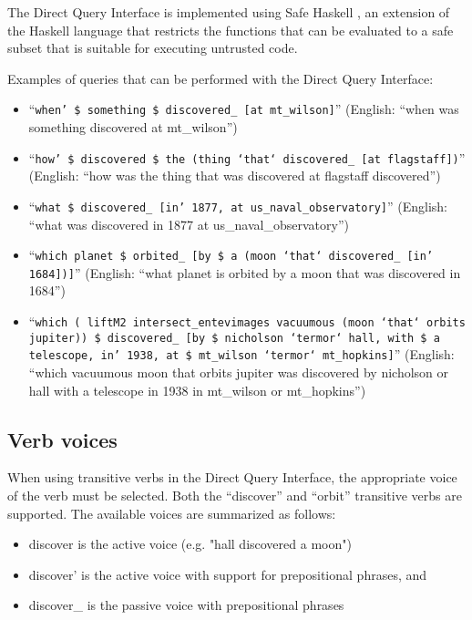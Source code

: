 \documentclass[../main.tex]{subfiles}
\begin{document}
The Direct Query Interface is implemented using Safe Haskell \cite{safehaskell}, an extension of the Haskell language that restricts the functions that can be evaluated
to a safe subset that is suitable for executing untrusted code.

Examples of queries that can be performed with the Direct Query Interface:
\begin{itemize}
	\item ``\texttt{when' \$ something \$ discovered\_ [at mt\_wilson]}'' (English: ``when was something discovered at mt\_wilson'')
	\item ``\texttt{how' \$ discovered \$ the (thing `that` discovered\_ [at flagstaff])}'' (English: ``how was the thing that was discovered at flagstaff discovered'')
	\item ``\texttt{what \$ discovered\_ [in' 1877, at us\_naval\_observatory]}'' (English: ``what was discovered in 1877 at us\_naval\_observatory'')
	\item ``\texttt{which planet \$ orbited\_ [by \$ a (moon `that` discovered\_ [in' 1684])]}'' (English: ``what planet is orbited by a moon that was discovered in 1684'')
	\item ``\texttt{which ( liftM2 intersect\_entevimages vacuumous  (moon `that` orbits jupiter)) \$ discovered\_ [by \$ nicholson `termor` hall, with \$ a telescope, in' 1938, at \$ mt\_wilson `termor` mt\_hopkins]}'' (English: ``which vacuumous moon that orbits jupiter was discovered by nicholson or hall with a telescope in 1938 in mt\_wilson or mt\_hopkins'')
\end{itemize}

\subsection{Verb voices}

When using transitive verbs in the Direct Query Interface, the appropriate voice of the verb must be selected.  Both the ``discover'' and ``orbit''
transitive verbs are supported.  The available voices are summarized as follows:

\begin{itemize}
	\item discover is the active voice (e.g. "hall discovered a moon")
	\item discover' is the active voice with support for prepositional phrases, and
	\item discover\_ is the passive voice with prepositional phrases
\end{itemize}
\end{document}
